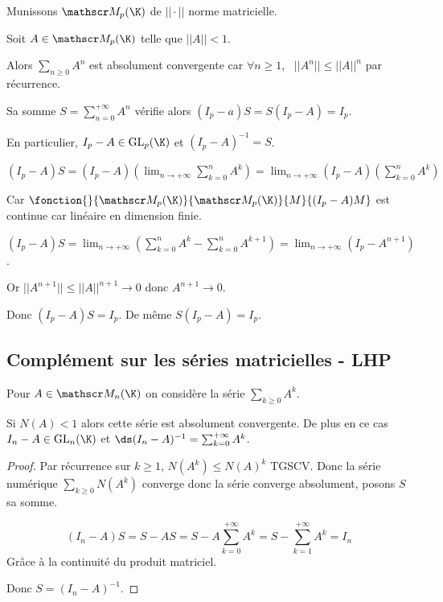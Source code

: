 \begin{exemple}
    Munissons $\mathscr M_p (\K)$ de $|| \cdot ||$ norme matricielle. 

    Soit $A \in \mathscr M_p(\K)$ telle que $|| A || < 1$. 

    Alors $\sum_{n \geqslant 0 } A^n$ est absolument convergente car 
    $\forall n \geqslant 1$, \, $|| A^n || \leqslant || A ||^n$ par récurrence. 

    Sa somme $\displaystyle S = \sum_{n = 0}^{+ \infty } A^n$ vérifie alors $(I_p - a ) S = S(I_p - A) = I_p$.

    En particulier, $I_p - A \in \operatorname{GL}_p (\K)$ et $(I_p - A)^{-1} = S$. 

    $\displaystyle (I_p - A)S = (I_p - A) \left(\lim_{n \to + \infty} \sum_{k = 0 }^{n } A^k \right) = \lim_{n \to + \infty} (I_p - A) \left( \sum_{k = 0}^{n } A^k \right) $

    Car $\fonction {}{\mathscr M_p(\K)}{\mathscr M_p(\K)}{M}{(I_p - A)M}$ est continue car linéaire
    en dimension finie. 

    $\displaystyle (I_p - A)S = \lim_{n \to + \infty} \left( \sum_{k = 0}^{n } A^k - \sum_{k = 0}^{n } A^{k + 1} \right) = \lim_{n \to + \infty} (I_p - A^{n + 1})$.

    Or $|| A^{n + 1} || \leqslant || A ||^{n + 1} \longrightarrow 0$ donc $A^{n + 1} \longrightarrow 0$.

    Donc $(I_p - A)S = I_p$. De même $S(I_p - A) = I_p$.
\end{exemple}

\subsection{Complément sur les séries matricielles - LHP}

Pour $A \in \mathscr M_n(\K)$ on considère la série $\sum_{k \geqslant 0} A^k$.

Si $N(A) < 1$ alors cette série est absolument convergente. De plus en ce cas $I_n - A \in \text{GL}_n(\K)$
et $\ds (I_n - A)^{-1} = \sum_{k=0}^{+ \infty} A^k$.

\begin{proof}
Par récurrence sur $k \geqslant 1$, $N(A^k) \leqslant N(A)^k$ TGSCV.
Donc la série numérique $\sum_{k\geqslant 0} N(A^k)$ converge donc la série converge absolument, posons $S$ sa somme.

\[(I_n - A)S = S - AS = S - A \sum_{k=0}^{+ \infty} A^k = S - \sum_{k=1}^{+ \infty} A^k = I_n\]
Grâce à la continuité du produit matriciel.

Donc $S = (I_n - A)^{-1}$.
\end{proof}

